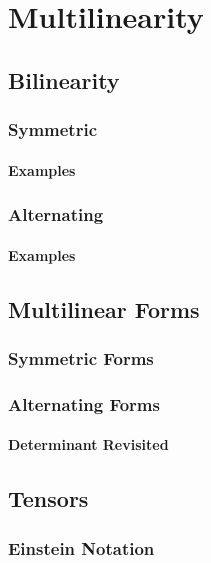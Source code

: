 \chapter{Multilinearity}
\section{Bilinearity}
\subsection{Symmetric}
\subsubsection{Examples}
\subsection{Alternating}
\subsubsection{Examples}

\section{Multilinear Forms}
\subsection{Symmetric Forms}
\subsection{Alternating Forms}
\subsubsection{Determinant Revisited}

\section{Tensors}
\subsection{Einstein Notation}
